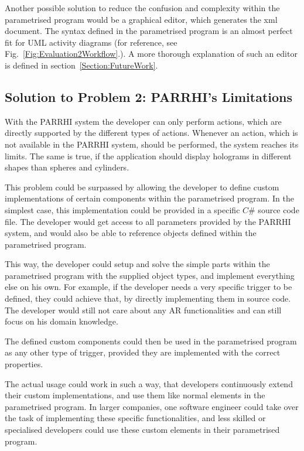 Another possible solution to reduce the confusion and complexity within the parametrised program would be a graphical editor, which generates the xml document. The syntax defined in the parametrised program is an almost perfect fit for UML activity diagrams (for reference, see Fig.~\ref{Fig:Evaluation2Workflow}.). A more thorough explanation of such an editor is defined in section~\ref{Section:FutureWork}.

\subsection{Solution to Problem 2: PARRHI's Limitations}

With the PARRHI system the developer can only perform actions, which are directly supported by the different types of actions. Whenever an action, which is not available in the PARRHI system, should be performed, the system reaches its limits. The same is true, if the application should display holograms in different shapes than spheres and cylinders.

This problem could be surpassed by allowing the developer to define custom implementations of certain components within the parametrised program. In the simplest case, this implementation could be provided in a specific $C\#$ source code file. The developer would get access to all parameters provided by the PARRHI system, and would also be able to reference objects defined within the parametrised program.

This way, the developer could setup and solve the simple parts within the parametrised program with the supplied object types, and implement everything else on his own. For example, if the developer needs a very specific trigger to be defined, they could achieve that, by directly implementing them in source code. The developer would still not care about any AR functionalities and can still focus on his domain knowledge. 

The defined custom components could then be used in the parametrised program as any other type of trigger, provided they are implemented with the correct properties. 

The actual usage could work in such a way, that developers continuously extend their custom implementations, and use them like normal elements in the parametrised program. In larger companies, one software engineer could take over the task of implementing these specific functionalities, and less skilled or specialised developers could use these custom elements in their parametrised program.


